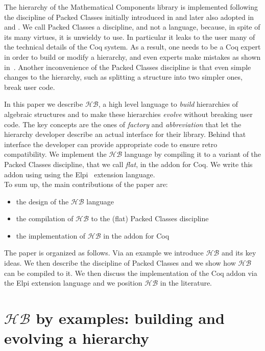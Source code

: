 \documentclass[a4paper,UKenglish,cleveref, autoref]{lipics-v2019}
\newcommand{\HB}{\ensuremath{\mathcal{HB}}}
\newcommand{\hb}{\coq{hierarchy-builder}}
\newcommand{\factory}{factory}
\newcommand{\phantterm}{abbreviation}
\theoremstyle{implem}
\theoremstyle{implem}
\theoremstyle{command}
\begin{document}
The hierarchy of the Mathematical Components library
is implemented following the discipline of Packed Classes initially introduced
in \cite{DBLP:conf/tphol/GarillotGMR09} and later also adopted in
\cite{DBLP:conf/mpc/AffeldtNS19} and \cite{DBLP:journals/mics/BoldoLM15}.
We call Packed Classes a discipline, and not a language, because, in spite of
its many virtues, it is unwieldy to use. In particular it leaks to the user
many of the technical details of the Coq system. As a result, one
needs to be a Coq expert in order to build or modify a hierarchy, and even
experts make mistakes as shown in~\cite{KSdraft}.
Another inconvenience of the Packed Classes discipline is that even
simple changes to the hierarchy, such as splitting a structure into
two simpler ones, break user code.

In this paper we describe \HB{}, a high level language
to \emph{build} hierarchies of algebraic structures and to make these hierarchies
\emph{evolve} without breaking user code. The key concepts are the ones of
\emph{\factory{}} and \emph{\phantterm{}} that let the hierarchy developer describe an actual
interface for their library. Behind that interface the developer can provide
appropriate code to ensure retro compatibility.
We implement the \HB{} language by compiling it
to a variant of the Packed Classes discipline, that we call \emph{flat},
in the \hb{} addon for Coq. We write this addon using using the
Elpi~\cite{DBLP:conf/lpar/DunchevGCT15,CoqElpi} extension language.\\

\noindent To sum up, the main contributions of the paper are:
\begin{itemize}
\item the design of the \HB{} language
\item the compilation of \HB{} to the (flat) Packed Classes discipline
\item the implementation of \HB{} in the \hb{} addon for Coq
\end{itemize}
The paper is organized as follows. Via an example we introduce
\HB{} and its key ideas. %
We then describe the discipline
of Packed Classes and we show how \HB{} can be compiled to it.
We then discuss the implementation of the Coq addon via the Elpi extension
language and we position \HB{} in the literature.

\section{\HB{} by examples: building and evolving a hierarchy}
\label{sec:example}
\end{document}
